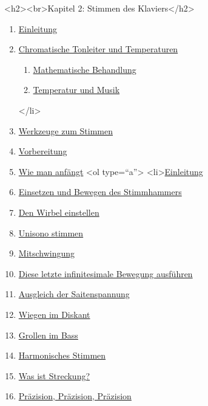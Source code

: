 {<h2><br>Kapitel 2: Stimmen des Klaviers</h2> 

\begin{enumerate} 
 \item \hyperref[c2_1]{Einleitung}
 \item \hyperref[c2_2]{Chromatische Tonleiter und Temperaturen}
  \begin{enumerate}[label={\alph*.}] 
   <li>\hyperref[c2_2a]{Einleitung}
   \item \hyperref[c2_2b]{Mathematische Behandlung}
   \item \hyperref[c2_2c]{Temperatur und Musik}
  \end{enumerate}
 </li>
 \item \hyperref[c2_3]{Werkzeuge zum Stimmen}
 \item \hyperref[c2_4]{Vorbereitung}
 \item \hyperref[c2_5]{Wie man anfängt}
  <ol type=\enquote{a}>
   <li>\hyperref[c2_5a]{Einleitung}
   \item \hyperref[c2_5_hamm]{Einsetzen und Bewegen des Stimmhammers}
   \item \hyperref[c2_5_wirb]{Den Wirbel einstellen}
   \item \hyperref[c2_5_unis]{Unisono stimmen}
   \item \hyperref[c2_5_mits]{Mitschwingung}
   \item \hyperref[c2_5_infi]{Diese letzte infinitesimale Bewegung ausführen}
   \item \hyperref[c2_5_span]{Ausgleich der Saitenspannung}
   \item \hyperref[c2_5_disk]{Wiegen im Diskant}
   \item \hyperref[c2_5_bass]{Grollen im Bass}
   \item \hyperref[c2_5_harm]{Harmonisches Stimmen}
   \item \hyperref[c2_5_stre]{Was ist Streckung?}
   \item \hyperref[c2_5_prae]{Präzision, Präzision, Präzision}

\end{enumerate}}
